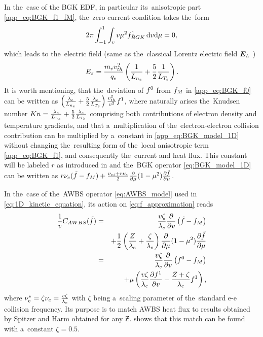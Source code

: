 In the~case of the BGK EDF, in particular its~anisotropic part 
\eqref{app_eq:BGK_f1_fM}, the~zero current condition takes the~form
\begin{equation}
  2\pi\int_{-1}^{1} \int_{v} v \mu^2 f^1_{BGK}\, \text{d}v\text{d}\mu = 0 ,
  \nonumber
\end{equation}
which leads to the~electric field (same as the~classical Lorentz electric field
$\boldsymbol{E}_L$ \cite{Lorentz_1905})
\begin{equation}
  E_z = \frac{m_ev_{th}^2}{q_e}\left(\frac{1}{L_{n_e}} 
  + \frac{5}{2}\frac{1}{L_{T_e}} \right) .
  \label{app_eq:BGK_Efield}
\end{equation}
It is worth mentioning, that the~deviation of $f^0$ from $f_M$ in 
\eqref{app_eq:BGK_f0} can be written as $\left(\frac{\lambda_e}{L_{n_e}} 
  + \frac{5}{2}\frac{\lambda_e}{L_{T_e}} \right)\frac{v_{th}^2}{v^2}f^1$,
where naturally arises the~Knudsen number 
$Kn = \frac{\lambda_e}{L_{n_e}} + \frac{5}{2}\frac{\lambda_e}{L_{T_e}}$ comprising
both contributions of electron density and temperature gradients, and that 
a~multiplication of the~electron-electron collision contribution can be 
multiplied by a~constant in \eqref{app_eq:BGK_model_1D} without changing 
the~resulting form of the~local anisotropic term \eqref{app_eq:BGK_f1},
and consequently the~current and heat flux. This constant will be labeled $r$
as introduced in \cite{Brodrick_PoP2017} and the~BGK operator 
\eqref{eq:BGK_model_1D} can be written as 
$r \nu_{e}(\tilde{f} - f_M) + \frac{\nu_{ei} + r \nu_{e}}{2}
  \frac{\partial{}}{\partial{\mu}}(1 - \mu^2)\frac{\partial{\tilde{f}}}{\partial{\mu}}$. 

In the~case of the~AWBS operator \eqref{eq:AWBS_model} used in 
\eqref{eq:1D_kinetic_equation}, its action on \eqref{eq:f_approximation} reads
\begin{eqnarray}
  \frac{1}{v}C_{AWBS}(\tilde{f})
  &=& 
  \frac{v\zeta}{\lambda_e} \frac{\partial{}}{\partial{v}}\left(\tilde{f} - f_M\right) 
  \nonumber \\
  && + \frac{1}{2}\left(\frac{Z}{\lambda_e} + \frac{\zeta}{\lambda_e}\right)
  \frac{\partial{}}{\partial{\mu}}(1 - \mu^2)\frac{\partial{\tilde{f}}}{\partial{\mu}}  \nonumber \\
  &=& \frac{v\zeta}{\lambda_e} \frac{\partial{}}{\partial{v}}\left(f^0 - f_M\right) \nonumber \\ 
  &&\, + \mu\left(\frac{v\zeta}{\lambda_e} \frac{\partial{f^1}}{\partial{v}} 
  - \frac{Z+\zeta}{\lambda_e}f^1\right) ,
  \label{app_eq:AWBS_model_1D}
\end{eqnarray}
where $\nu_{e}^* = \zeta \nu_{e} = \frac{v\zeta}{\lambda_e}$ with $\zeta$ being a~scaling
parameter of the~standard e-e collision frequency. Its purpose is to
match AWBS heat flux to results obtained by Spitzer and Harm 
\cite{SpitzerHarm_PR1953} obtained for any $\Zbar$. 
 shows that this match can be found with 
a~constant $\zeta=0.5$.

